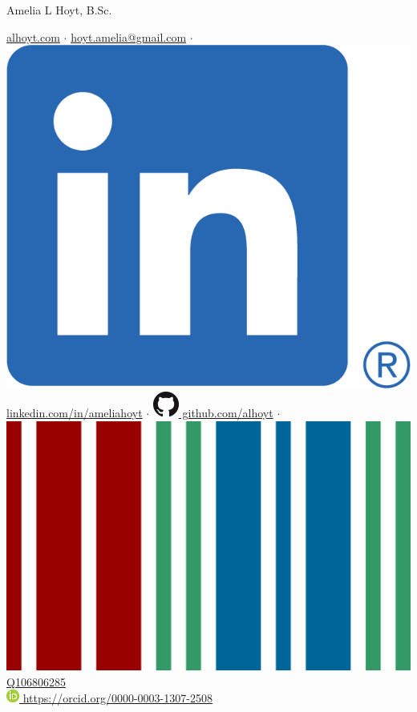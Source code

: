 \documentclass[11pt,a4paper,sans]{moderncv} %
\begin{document}
{\Huge Amelia L Hoyt, B.Sc.}

\vspace{3mm}

\href{https://alhoyt.com}{alhoyt.com}
$\cdot$
\href{mailto:hoyt.amelia@gmail.com}{hoyt.amelia@gmail.com}
$\cdot$
\href{https://linkedin.com/in/ameliahoyt}{\includegraphics[scale=0.055]{img/LI-In-Bug} linkedin.com/in/ameliahoyt}
$\cdot$
\href{https://github.com/alhoyt}{\includegraphics[scale=0.25]{img/GitHub-Mark-32px} github.com/alhoyt}
$\cdot$
\href{https://www.wikidata.org/wiki/Q106806285}{\includegraphics[scale=0.01]{img/wikidata_logo} Q106806285}
\\
\href{https://orcid.org/0000-0003-1307-2508}{\includegraphics[scale=0.5]{img/ORCIDiD_icon16x16} https://orcid.org/0000-0003-1307-2508}
\end{document}

